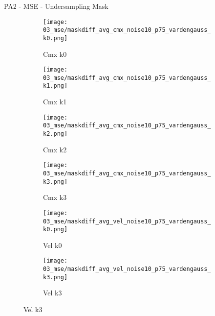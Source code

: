 \documentclass{beamer}
\begin{document}
\begin{frame}{PA2 - MSE - Undersampling Mask}{}
\begin{figure}
\begin{subfigure}{0.24\textwidth}
\texttt{[image: 03\_mse/maskdiff\_avg\_cmx\_noise10\_p75\_vardengauss\_k0.png]}
\vspace{-20pt}
\caption*{\tiny Cmx k0}
\end{subfigure}
\begin{subfigure}{0.24\textwidth}
\texttt{[image: 03\_mse/maskdiff\_avg\_cmx\_noise10\_p75\_vardengauss\_k1.png]}
\vspace{-20pt}
\caption*{\tiny Cmx k1}
\end{subfigure}
\begin{subfigure}{0.24\textwidth}
\texttt{[image: 03\_mse/maskdiff\_avg\_cmx\_noise10\_p75\_vardengauss\_k2.png]}
\vspace{-20pt}
\caption*{\tiny Cmx k2}
\end{subfigure}
\begin{subfigure}{0.24\textwidth}
\texttt{[image: 03\_mse/maskdiff\_avg\_cmx\_noise10\_p75\_vardengauss\_k3.png]}
\vspace{-20pt}
\caption*{\tiny Cmx k3}
\end{subfigure}

\begin{subfigure}{0.49\textwidth}
\texttt{[image: 03\_mse/maskdiff\_avg\_vel\_noise10\_p75\_vardengauss\_k0.png]}
\vspace{-20pt}
\caption*{\tiny Vel k0}
\end{subfigure}
\begin{subfigure}{0.49\textwidth}
\texttt{[image: 03\_mse/maskdiff\_avg\_vel\_noise10\_p75\_vardengauss\_k3.png]}
\vspace{-20pt}
\caption*{\tiny Vel k3}
\end{subfigure}
\end{figure}
\end{frame}
\end{document}

